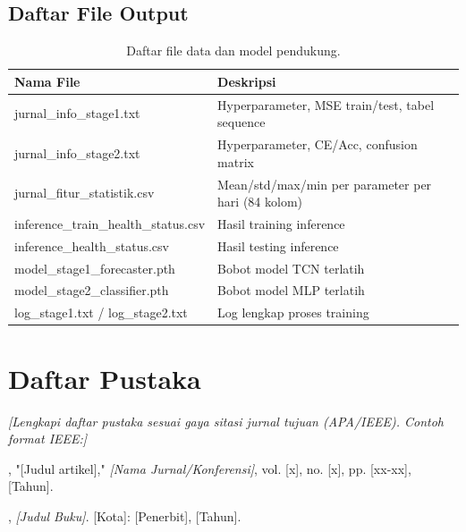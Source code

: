 \documentclass[11pt,a4paper]{article}
\begin{document}
\subsection{Daftar File Output}
\begin{table}[H]
    \centering
    \small
    \caption{Daftar file data dan model pendukung.}
    \begin{tabular}{ll}
        \toprule
        \textbf{Nama File} & \textbf{Deskripsi} \\
        \midrule
        jurnal\_info\_stage1.txt & Hyperparameter, MSE train/test, tabel sequence \\
        jurnal\_info\_stage2.txt & Hyperparameter, CE/Acc, confusion matrix \\
        jurnal\_fitur\_statistik.csv & Mean/std/max/min per parameter per hari (84 kolom) \\
        inference\_train\_health\_status.csv & Hasil training inference \\
        inference\_health\_status.csv & Hasil testing inference \\
        model\_stage1\_forecaster.pth & Bobot model TCN terlatih \\
        model\_stage2\_classifier.pth & Bobot model MLP terlatih \\
        log\_stage1.txt / log\_stage2.txt & Log lengkap proses training \\
        \bottomrule
    \end{tabular}
\end{table}

\section*{Daftar Pustaka}
\textit{[Lengkapi daftar pustaka sesuai gaya sitasi jurnal tujuan (APA/IEEE). Contoh format IEEE:]}
\begin{enumerate}[label={[\arabic*]}]
    \item [Nama Penulis], "[Judul artikel]," \textit{[Nama Jurnal/Konferensi]}, vol. [x], no. [x], pp. [xx-xx], [Tahun].
    \item [Nama Penulis], \textit{[Judul Buku]}. [Kota]: [Penerbit], [Tahun].
\end{enumerate}
\end{document}
